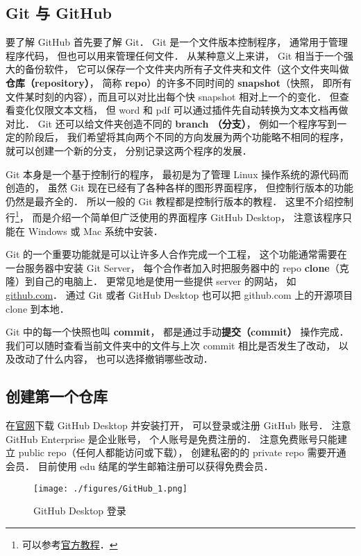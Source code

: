 
\subsection{Git 与 GitHub}
要了解 GitHub 首先要了解 Git． Git 是一个文件版本控制程序， 通常用于管理程序代码， 但也可以用来管理任何文件． 从某种意义上来讲， Git 相当于一个强大的备份软件， 它可以保存一个文件夹内所有子文件夹和文件（这个文件夹叫做 \textbf{仓库（repository）}， 简称 \textbf{repo}）的许多不同时间的 \textbf{snapshot}（快照， 即所有文件某时刻的内容），而且可以对比出每个快 snapshot 相对上一个的变化． 但查看变化仅限文本文档， 但 word 和 pdf 可以通过插件先自动转换为文本文档再做对比． Git 还可以给文件夹创造不同的 \textbf{branch （分支）}， 例如一个程序写到一定的阶段后， 我们希望将其向两个不同的方向发展为两个功能略不相同的程序，就可以创建一个新的分支， 分别记录这两个程序的发展．

Git 本身是一个基于控制行的程序， 最初是为了管理 Linux 操作系统的源代码而创造的， 虽然 Git 现在已经有了各种各样的图形界面程序， 但控制行版本的功能仍然是最齐全的． 所以一般的 Git 教程都是控制行版本的教程． 这里不介绍控制行\footnote{可以参考\href{https://git-scm.com/book/en/v2}{官方教程}．}， 而是介绍一个简单但广泛使用的界面程序 GitHub Desktop， 注意该程序只能在 Windows 或 Mac 系统中安装．

Git 的一个重要功能就是可以让许多人合作完成一个工程， 这个功能通常需要在一台服务器中安装 Git Server， 每个合作者加入时把服务器中的 repo \textbf{clone}（克隆）到自己的电脑上． 更常见地是使用一些提供 server 的网站， 如 \href{https://github.com}{github.com}． 通过 Git 或者 GitHub Desktop 也可以把 github.com 上的开源项目 clone 到本地．

Git 中的每一个快照也叫 \textbf{commit}， 都是通过手动\textbf{提交（commit）} 操作完成． 我们可以随时查看当前文件夹中的文件与上次 commit 相比是否发生了改动， 以及改动了什么内容， 也可以选择撤销哪些改动．
 
\subsection{创建第一个仓库}
在\href{https://desktop.github.com/}{官网}下载 GitHub Desktop 并安装打开， 可以登录或注册 GitHub 账号． 注意 GitHub Enterprise 是企业账号， 个人账号是免费注册的． 注意免费账号只能建立 public repo（任何人都能访问或下载）， 创建私密的的 private repo 需要开通会员． 目前使用 edu 结尾的学生邮箱注册可以获得免费会员．

\begin{figure}[ht]
\centering
\texttt{[image: ./figures/GitHub\_1.png]}
\caption{GitHub Desktop 登录} \label{GitHub_fig1}
\end{figure}

